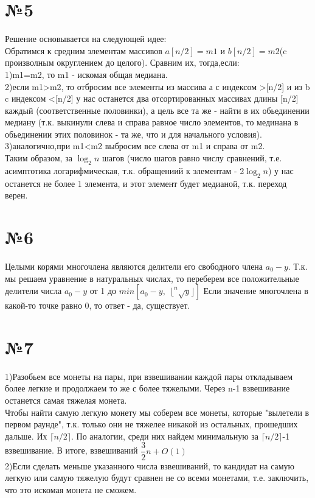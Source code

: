 \documentclass[a4paper,12pt]{article} %
\begin{document}
\section*{№5}
Решение основывается на следующей идее:\\
Обратимся к средним элементам массивов $a[n/2]=m1$ и $b[n/2]=m2$(c произволным округлением до целого). Сравним их, тогда,если:\\
1)m1=m2, то m1 - искомая общая медиана.\\
2)если m1>m2, то отбросим все элементы из массива а с индексом >[n/2] и из b c индексом <[n/2] у нас останется два отсортированных массивах длины [n/2] каждый (соответственные половинки), а цель все та же - найти в их обьединении медиану (т.к. выкинули слева и справа равное число элементов, то мединана в обьединении этих половинок - та же, что и для начального условия).
3)аналогично,при m1<m2 выбросим все слева от m1 и справа от m2.\\
Таким образом, за $\log_{2}{n}$ шагов (число шагов равно числу сравнений, т.е. асимптотика логарифмическая, т.к. обращениий к элементам - 2$\log_{2}{n}$) у нас останется не более 1 элемента, и этот элемент будет медианой, т.к. переход верен.\\


\section*{№6}
Целыми корями многочлена являются делители его свободного члена $a_0-y$. Т.к. мы решаем уравнение в натуральных числах, то переберем все положительные делители числа $a_0-y$ от 1 до $min[a_0-y,\hspace{5pt}\lfloor^n\sqrt{y}\rfloor]$
Если значение многочлена в какой-то точке равно 0, то ответ - да, существует.\\


\section*{№7}
1)Разобьем все монеты на пары, при взвешивании каждой пары откладываем более легкие и продолжаем то же с более тяжелыми. Через n-1 взвешивание останется самая тяжелая монета.\\
Чтобы найти самую легкую монету мы соберем все монеты, которые "вылетели в первом раунде", т.к. только они не тяжелее никакой из остальных, прошедших дальше. Их $\lceil n/2 \rceil$. По аналогии, среди них найдем минимальную за $\lceil n/2 \rceil$-1 взвешивание. В итоге, взвешиваний $\dfrac{3}{2}n+O(1)$ \\
2)Если сделать меньше указанного числа взвешиваний, то кандидат на самую легкую или самую тяжелую будут сравнен не со всеми монетами, т.е. заключить, что это искомая монета не сможем. \\
\end{document}
